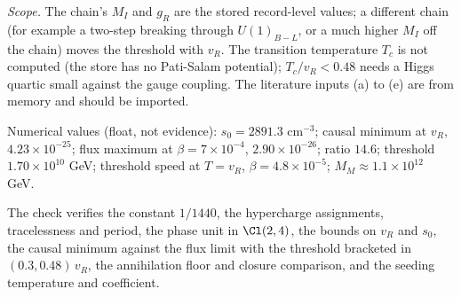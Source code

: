 \emph{Scope.} The chain's $M_{I}$ and $g_{R}$ are the stored record-level values; a different chain (for example a two-step breaking through $U(1)_{B-L}$, or a much higher $M_{I}$ off the chain) moves the threshold with $v_{R}$. The transition temperature $T_{c}$ is not computed (the store has no Pati-Salam potential); $T_{c}/v_{R} < 0.48$ needs a Higgs quartic small against the gauge coupling. The literature inputs (a) to (e) are from memory and should be imported.

Numerical values (float, not evidence): $s_{0} = 2891.3$ cm$^{-3}$; causal minimum at $v_{R}$, $4.23 \times 10^{-25}$; flux maximum at $\beta = 7 \times 10^{-4}$, $2.90 \times 10^{-26}$; ratio $14.6$; threshold $1.70 \times 10^{10}$ GeV; threshold speed at $T = v_{R}$, $\beta = 4.8 \times 10^{-5}$; $M_{M} \approx 1.1 \times 10^{12}$ GeV.

The check verifies the constant $1/1440$, the hypercharge assignments, tracelessness and period, the phase unit in $\Cl(2,4)$, the bounds on $v_{R}$ and $s_{0}$, the causal minimum against the flux limit with the threshold bracketed in $(0.3, 0.48)\,v_{R}$, the annihilation floor and closure comparison, and the seeding temperature and coefficient.
